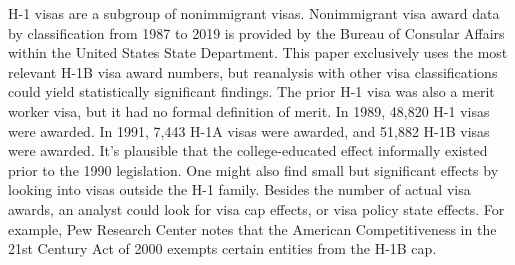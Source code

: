 \documentclass[review]{elsarticle}
\begin{document}
H-1 visas are a subgroup of nonimmigrant visas.
Nonimmigrant visa award data by classification from 1987 to 2019 is provided by
the Bureau of Consular Affairs within the United States State Department\cite{bureauof_2020}.
This paper exclusively uses the most relevant H-1B visa award numbers,
but reanalysis with other visa classifications could yield statistically significant findings.
The prior H-1 visa was also a merit worker visa, but it had no formal definition of merit.
In 1989, 48,820 H-1 visas were awarded.
In 1991, 7,443 H-1A visas were awarded, and 51,882 H-1B visas were awarded.
It's plausible that the college-educated effect informally existed prior to the 1990 legislation.
One might also find small but significant effects by looking into visas outside the H-1 family.
Besides the number of actual visa awards, an analyst could look for visa cap effects,
or visa policy state effects.
For example, Pew Research Center notes that the American Competitiveness in the 21st Century Act of 2000 exempts certain entities from the H-1B cap\cite{ruiz2017key}.
% 
% 
\end{document}
